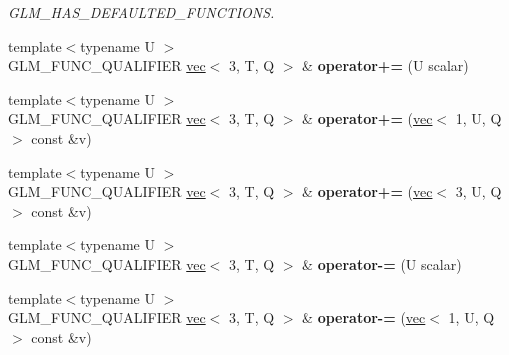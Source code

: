 \begin{DoxyCompactItemize}
\begin{DoxyCompactList}\small\item\em G\+L\+M\+\_\+\+H\+A\+S\+\_\+\+D\+E\+F\+A\+U\+L\+T\+E\+D\+\_\+\+F\+U\+N\+C\+T\+I\+O\+NS. \end{DoxyCompactList}\item 
\mbox{\label{structglm_1_1vec_3_013_00_01T_00_01Q_01_4_acb693fdeaa576d503444ee370c423cf3}} 
{\footnotesize template$<$typename U $>$ }\\G\+L\+M\+\_\+\+F\+U\+N\+C\+\_\+\+Q\+U\+A\+L\+I\+F\+I\+ER \hyperlink{structglm_1_1vec}{vec}$<$ 3, T, Q $>$ \& {\bfseries operator+=} (U scalar)
\item 
\mbox{\label{structglm_1_1vec_3_013_00_01T_00_01Q_01_4_aeed08e334ed3515bdb2050d15877bbe8}} 
{\footnotesize template$<$typename U $>$ }\\G\+L\+M\+\_\+\+F\+U\+N\+C\+\_\+\+Q\+U\+A\+L\+I\+F\+I\+ER \hyperlink{structglm_1_1vec}{vec}$<$ 3, T, Q $>$ \& {\bfseries operator+=} (\hyperlink{structglm_1_1vec}{vec}$<$ 1, U, Q $>$ const \&v)
\item 
\mbox{\label{structglm_1_1vec_3_013_00_01T_00_01Q_01_4_a6e025799ccd139ed94645bf141eed279}} 
{\footnotesize template$<$typename U $>$ }\\G\+L\+M\+\_\+\+F\+U\+N\+C\+\_\+\+Q\+U\+A\+L\+I\+F\+I\+ER \hyperlink{structglm_1_1vec}{vec}$<$ 3, T, Q $>$ \& {\bfseries operator+=} (\hyperlink{structglm_1_1vec}{vec}$<$ 3, U, Q $>$ const \&v)
\item 
\mbox{\label{structglm_1_1vec_3_013_00_01T_00_01Q_01_4_a806d4a3b1fa79272d2b5ca58c62b95c1}} 
{\footnotesize template$<$typename U $>$ }\\G\+L\+M\+\_\+\+F\+U\+N\+C\+\_\+\+Q\+U\+A\+L\+I\+F\+I\+ER \hyperlink{structglm_1_1vec}{vec}$<$ 3, T, Q $>$ \& {\bfseries operator-\/=} (U scalar)
\item 
\mbox{\label{structglm_1_1vec_3_013_00_01T_00_01Q_01_4_ac0d8da1814d255fc6876b12519cccfb8}} 
{\footnotesize template$<$typename U $>$ }\\G\+L\+M\+\_\+\+F\+U\+N\+C\+\_\+\+Q\+U\+A\+L\+I\+F\+I\+ER \hyperlink{structglm_1_1vec}{vec}$<$ 3, T, Q $>$ \& {\bfseries operator-\/=} (\hyperlink{structglm_1_1vec}{vec}$<$ 1, U, Q $>$ const \&v)

\end{DoxyCompactItemize}
